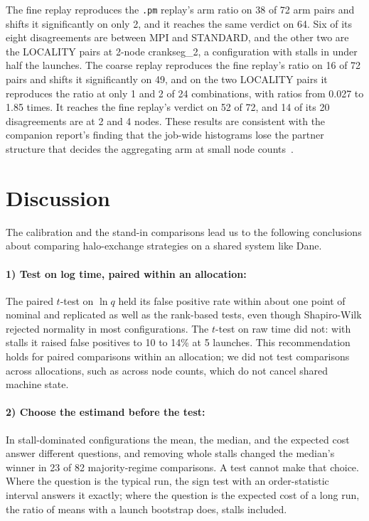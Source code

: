 \documentclass[11pt]{article}
\newcommand{\pmrep}{\texttt{.pm} replay}
\begin{document}
The fine replay reproduces the \pmrep's arm ratio on 38 of 72 arm pairs and shifts it
significantly on only 2, and it reaches the same verdict on 64. Six of its eight
disagreements are between MPI and STANDARD, and the other two are the LOCALITY pairs at
2-node crankseg\_2, a configuration with stalls in under half the launches. The coarse replay reproduces the fine replay's ratio on 16 of 72 pairs and
shifts it significantly on 49, and on the two LOCALITY pairs it reproduces the ratio at
only 1 and 2 of 24 combinations, with ratios from 0.027 to 1.85 times. It reaches the fine
replay's verdict on 52 of 72, and 14 of its 20 disagreements are at 2 and 4 nodes. These
results are consistent with the companion report's finding that the job-wide histograms
lose the partner structure that decides the aggregating arm at small node
counts~\cite{ladderreport}.

\section{Discussion}
\label{sec:discussion}

The calibration and the stand-in comparisons lead us to the following conclusions about
comparing halo-exchange strategies on a shared system like Dane.

\paragraph{1) Test on log time, paired within an allocation:} The paired $t$-test on
$\ln q$ held its false positive rate within about one point of nominal and replicated as
well as the rank-based tests, even though Shapiro-Wilk rejected normality in most
configurations. The $t$-test on raw time did not: with stalls it raised false positives to
10 to 14\% at 5 launches. This recommendation holds for paired comparisons within an
allocation; we did not test comparisons across allocations, such as across node counts,
which do not cancel shared machine state.

\paragraph{2) Choose the estimand before the test:} In stall-dominated configurations the
mean, the median, and the expected cost answer different questions, and removing whole
stalls changed the median's winner in 23 of 82 majority-regime comparisons. A test cannot
make that choice. Where the question is the typical run, the sign test with an
order-statistic interval answers it exactly; where the question is the expected cost of a
long run, the ratio of means with a launch bootstrap does, stalls included.
\end{document}
